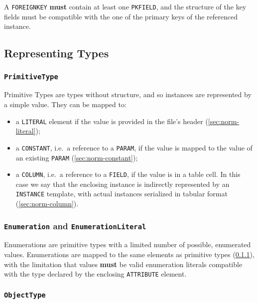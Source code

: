 \documentclass[11pt,a4paper]{ivoa}
\begin{document}
A \texttt{FOREIGNKEY} \textbf{must} contain at least one
\texttt{PKFIELD}, and the structure of the key fields must be compatible
with the one of the primary keys of the referenced instance.

\subsection{Representing Types}\label{sec:norm-types}

\subsubsection{\textbf{\texttt{PrimitiveType}}}\label{sec:norm-map-primitive}

Primitive Types are types without structure, and so instances are
represented by a simple value. They can be mapped to:

\begin{itemize}
\itemsep1pt\parskip0pt
\item
  a \texttt{LITERAL} element if the value is provided in the file's
  header (\ref{sec:norm-literal});
\item
  a \texttt{CONSTANT}, i.e.~a reference to a \texttt{PARAM}, if the
  value is mapped to the value of an existing \texttt{PARAM}
  (\ref{sec:norm-constant});
\item
  a \texttt{COLUMN}, i.e.~a reference to a \texttt{FIELD}, if the value
  is in a table cell. In this case we say that the enclosing instance is
  indirectly represented by an \texttt{INSTANCE} template, with actual
  instances serialized in tabular format (\ref{sec:norm-column}).
\end{itemize}

\subsubsection{\textbf{\texttt{Enumeration}} and
\textbf{\texttt{EnumerationLiteral}}}\label{sec:norm-map-enumeration}

Enumerations are primitive types with a limited number of possible,
enumerated values. Enumerations are mapped to the same elements as
primitive types (\ref{sec:norm-map-primitive}), with the limitation
that values \textbf{must} be valid enumeration literals compatible with
the type declared by the enclosing \texttt{ATTRIBUTE} element.

\subsubsection{\textbf{\texttt{ObjectType}}}\label{sec:norm-object}
\end{document}
